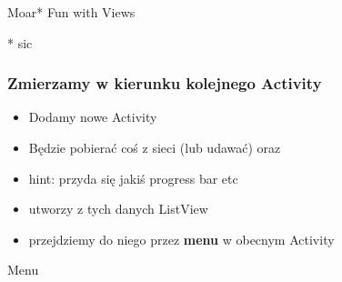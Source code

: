 % 
% 
% 
% 
% 
% 
% 




\begin{frame}
 \begin{center}
  \Huge{Moar* Fun with Views}
 \end{center}
\begin{flushright}
* sic
\end{flushright}
\end{frame}


\begin{frame}\frametitle{Zmierzamy w kierunku kolejnego Activity}
\begin{itemize}
 \item Dodamy nowe Activity
 \pause \item Będzie pobierać coś z sieci (lub udawać) oraz
 \pause \item hint: przyda się jakiś progress bar etc
 \pause \item utworzy z tych danych ListView
 \pause \item przejdziemy do niego przez \textbf{menu} w obecnym Activity
\end{itemize}
\end{frame}

\begin{frame}
\begin{center}
 \Huge{Menu}
\end{center}
\end{frame}


